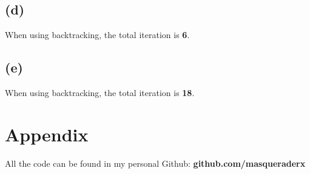 \documentclass[12pt, a4 paper]{article}
\begin{document}
\begin{framed}
        \subsection{(d)}
        When using backtracking, the total iteration is \textbf{6}.
        
        \subsection{(e)}
        When using backtracking, the total iteration is \textbf{18}. 
    \end{framed}

    \section{Appendix}
    All the code can be found in my personal Github: \textbf{github.com/masqueraderx}
\end{document}
